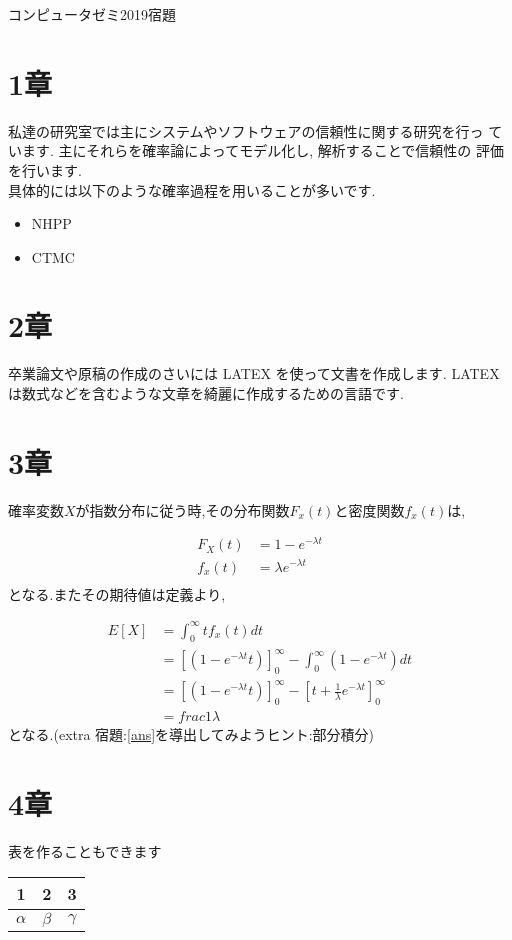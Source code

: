 \documentclass[a4paper,12pt]{article}
\begin{document}
\begin{center}
{\large コンピュータゼミ2019宿題}
\end{center}

\section{1章}
私達の研究室では主にシステムやソフトウェアの信頼性に関する研究を行っ
ています. 主にそれらを確率論によってモデル化し, 解析することで信頼性の
評価を行います.\\
具体的には以下のような確率過程を用いることが多いです.
\begin{itemize}
\item NHPP
\item CTMC
\end{itemize}

\section{2章}
卒業論文や原稿の作成のさいには LATEX を使って文書を作成します. LATEX
は数式などを含むような文章を綺麗に作成するための言語です.

\section{3章}
確率変数$X$が指数分布に従う時,その分布関数$F_x(t)$と密度関数$f_x(t)$は,

\begin{align}
F_X(t)  &=  1-e^{-\lambda t} \label{F_X} \\
f_x(t) &= \lambda e^{-\lambda t} \label{f_x}\\
\end{align}
となる.またその期待値は定義より,

\begin{align}
E[X] &= \int_{0}^{\infty}tf_x(t)dt\\
&= [(1-e^{-\lambda t}t)]_{0}^{\infty} - \int_{0}^{\infty}(1-e^{-\lambda t})dt\\
&= [(1-e^{-\lambda t}t)]_{0}^{\infty} - [t + \frac{1}{\lambda}e^{-\lambda t}]_{0}^{\infty}\\
&= frac{1}{\lambda} \label{ans}
\end{align}
となる.(extra 宿題:\ref{ans}を導出してみようヒント:部分積分)

\section{4章}
表を作ることもできます
\begin{tabular}{|c|c|c|}\hline
 1 & 2 & 3 \\\hline
$\alpha$&$\beta$&$\gamma$\\\hline
\end{tabular}
\end{document}
